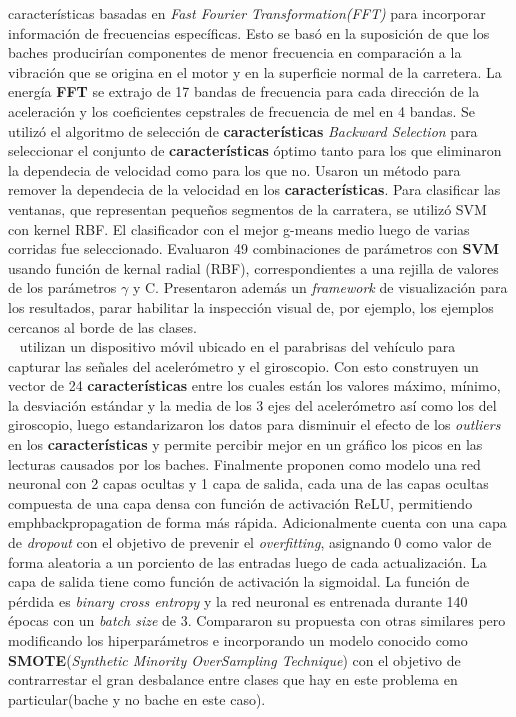 		características basadas en \emph{Fast Fourier Transformation(FFT)} para incorporar información de frecuencias específicas. Esto se basó en
		la suposición de que los baches producirían componentes de menor frecuencia en comparación a la vibración que se origina en el motor y en
		la superficie normal de la carretera. La energía \textbf{FFT} se extrajo de 17 bandas de frecuencia para cada dirección de la aceleración
		y los coeficientes cepstrales de frecuencia de mel en 4 bandas. Se utilizó el algoritmo de selección de \textbf{características} \emph{Backward
		Selection} para seleccionar el conjunto de \textbf{características} óptimo tanto para los que eliminaron la dependecia de velocidad como para los
		que no. Usaron un método para remover la dependecia de la velocidad en los \textbf{características}. Para clasificar las ventanas, que representan
		pequeños segmentos de la carratera, se utilizó SVM con kernel RBF. El clasificador con el mejor g-means medio luego de varias corridas fue
		seleccionado. Evaluaron 49 combinaciones de parámetros con \textbf{SVM} usando función de kernal radial (RBF), correspondientes a una
		rejilla de valores de los parámetros $\gamma$ y C. Presentaron además un \emph{framework} de visualización para los resultados, parar
		habilitar la inspección visual de, por ejemplo, los ejemplos cercanos al borde de las clases.\\

		~ utilizan un dispositivo móvil ubicado en el parabrisas del vehículo para capturar las señales del acelerómetro y el
		giroscopio. Con esto construyen un vector de 24 \textbf{características} entre los cuales están los valores máximo, mínimo, la desviación estándar y la media
		de los 3 ejes del acelerómetro así como los del giroscopio, luego estandarizaron los datos para disminuir el efecto de los \emph{outliers} en los
		\textbf{características} y permite percibir mejor en un gráfico los picos en las lecturas causados por los baches. Finalmente proponen como modelo una red
		neuronal con 2 capas ocultas y 1 capa de salida, cada una de las capas ocultas compuesta de una capa densa con función de activación ReLU, permitiendo
		\\emph{backpropagation} de forma más rápida. Adicionalmente cuenta con una capa de \emph{dropout} con el objetivo de prevenir el \emph{overfitting},
		asignando 0 como valor de forma aleatoria a un porciento de las entradas luego de cada actualización. La capa de salida tiene como función de activación
		la sigmoidal. La función de pérdida es \emph{binary cross entropy} y la red neuronal es entrenada durante 140 épocas con un \emph{batch size} de 3.
		Compararon su propuesta con otras similares pero modificando los hiperparámetros e incorporando un modelo conocido como \textbf{SMOTE}(\emph{Synthetic
		Minority OverSampling Technique}) con el objetivo de contrarrestar el gran desbalance entre clases que hay en este problema en particular(bache y no
		bache en este caso).\\

